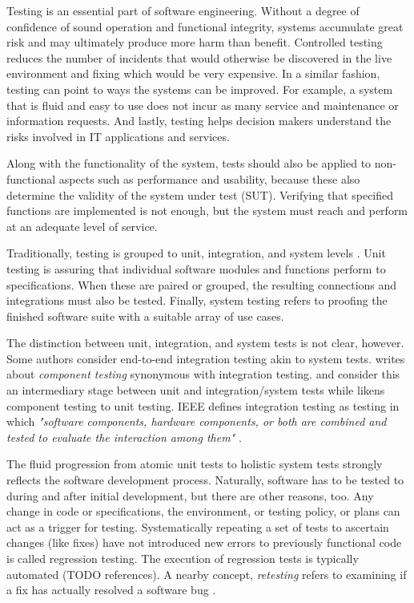 \documentclass[12pt,a4paper,oneside,pdftex]{report}
\begin{document}
Testing is an essential part of software engineering. Without a degree of confidence of sound operation and functional integrity, systems accumulate great risk and may ultimately produce more harm than benefit. Controlled testing reduces the number of incidents that would otherwise be discovered in the live environment and fixing which would be very expensive. \citep{jenkins2008software, liu2009unified} In a similar fashion, testing can point to ways the systems can be improved. For example, a system that is fluid and easy to use does not incur as many service and maintenance or information requests. And lastly, testing helps decision makers understand the risks involved in IT applications and services.

Along with the functionality of the system, tests should also be applied to non-functional aspects such as performance and usability, because these also determine the validity of the system under test (SUT). Verifying that specified functions are implemented is not enough, but the system must reach and perform at an adequate level of service. %

Traditionally, testing is grouped to unit, integration, and system levels \citep{jenkins2008software, burnstein2003practical}. Unit testing is assuring that individual software modules and functions perform to specifications. When these are paired or grouped, the resulting connections and integrations must also be tested. Finally, system testing refers to proofing the finished software suite with a suitable array of use cases. 

The distinction between unit, integration, and system tests is not clear, however. Some authors consider end-to-end integration testing akin to system tests. \citet{duvall2007continuous} writes about \emph{component testing} synonymous with integration testing. \citet{pezze2008software} and \citet{benz2007combining} consider this an intermediary stage between unit and integration/system tests while \citet{burnstein2003practical} likens component testing to unit testing. IEEE defines integration testing as testing in which \emph{"software components, hardware components, or both are combined and tested to evaluate the interaction among them"} \citep{ieee2010systems}.

The fluid progression from atomic unit tests to holistic system tests strongly reflects the software development process. Naturally, software has to be tested to during and after initial development, but there are other reasons, too. Any change in code or specifications, the environment, or testing policy, or plans can act as a trigger for testing. Systematically repeating a set of tests to ascertain changes (like fixes) have not introduced new errors to previously functional code is called regression testing. The execution of regression tests is typically automated (TODO references). A nearby concept, \textit{retesting} refers to examining if a fix has actually resolved a software bug \citep{jenkins2008software}.
\end{document}
